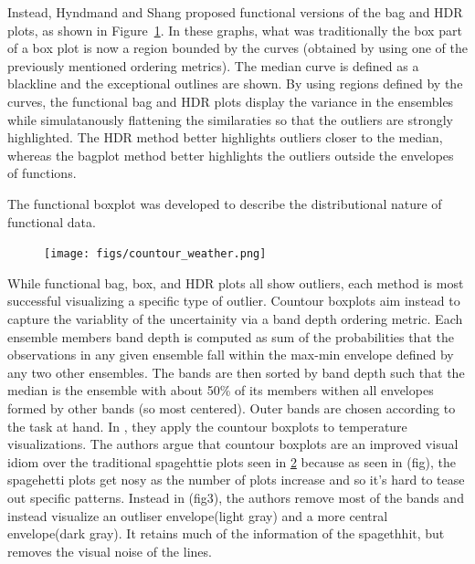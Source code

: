 \begin{figure}
\label{fig:funcbag}
\end{figure}
Instead, Hyndmand and Shang proposed functional versions of the bag and HDR
plots\cite{Hyndman2009}, as shown in Figure~\ref{fig:funcbag}. In these graphs,
what was traditionally the box part of a box plot is now a region bounded by
the curves (obtained by using one of the previously mentioned ordering
metrics). The median curve is defined as a blackline and the exceptional
outlines are shown. By using regions defined by the curves, the functional bag
and HDR plots display the variance in the ensembles while simulatanously
flattening the similaraties so that the outliers are strongly highlighted. The
HDR method better highlights outliers closer to the median, whereas the bagplot
method better highlights the outliers outside the envelopes of functions. 



The functional boxplot was developed to describe the distributional nature of functional data\cite{sun2011}. 


\begin{figure}
\texttt{[image: figs/countour\_weather.png]}
\label{fig:countour}
\end{figure}
While functional bag, box, and HDR plots all show outliers, each method is most
successful visualizing a specific type of outlier. Countour
boxplots\cite{whitaker3} aim instead to capture the variablity of the uncertainity via a band depth ordering metric. Each ensemble members band depth is computed as sum of the probabilities that the observations in any given ensemble fall within the max-min envelope defined by any two other ensembles. The bands are then sorted by band depth such that the median is the ensemble with about 50\% of its members withen all envelopes formed by other bands (so most centered). Outer bands are chosen according to the task at hand. In \cite{whitaker13}, they apply the countour boxplots to temperature visualizations. %
The authors argue that countour boxplots are an improved visual idiom over the traditional spagehttie plots seen in \ref{fig:countour} because as seen in (fig), the spagehetti plots get nosy as the number of plots increase and so it's hard to tease out specific patterns. Instead in (fig3), the authors remove most of the bands and instead visualize an outliser envelope(light gray) and a more central envelope(dark gray). It retains much of the information of the spagethhit, but removes the visual noise of the lines.  
